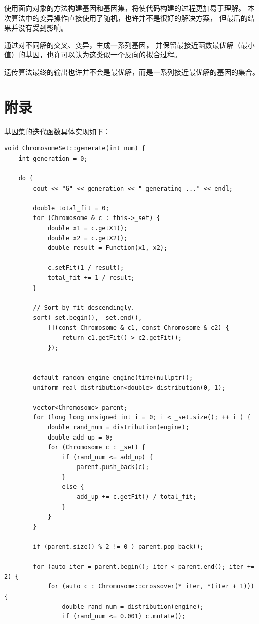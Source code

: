 \documentclass[UTF8]{ctexart}
\begin{document}
使用面向对象的方法构建基因和基因集，将使代码构建的过程更加易于理解。
本次算法中的变异操作直接使用了随机，也许并不是很好的解决方案，
但最后的结果并没有受到影响。

通过对不同解的交叉、变异，生成一系列基因，
并保留最接近函数最优解（最小值）的基因，也许可以认为这类似一个反向的拟合过程。

遗传算法最终的输出也许并不会是最优解，而是一系列接近最优解的基因的集合。


\section{附录}

基因集的迭代函数具体实现如下：

\begin{lstlisting}
void ChromosomeSet::generate(int num) {
    int generation = 0;

    do {
        cout << "G" << generation << " generating ..." << endl;

        double total_fit = 0;
        for (Chromosome & c : this->_set) {
            double x1 = c.getX1();
            double x2 = c.getX2();
            double result = Function(x1, x2);

            c.setFit(1 / result);
            total_fit += 1 / result;
        }

        // Sort by fit descendingly.
        sort(_set.begin(), _set.end(),
            [](const Chromosome & c1, const Chromosome & c2) {
                return c1.getFit() > c2.getFit();
            });


        default_random_engine engine(time(nullptr));
        uniform_real_distribution<double> distribution(0, 1);

        vector<Chromosome> parent;
        for (long long unsigned int i = 0; i < _set.size(); ++ i ) {
            double rand_num = distribution(engine);
            double add_up = 0;
            for (Chromosome c : _set) {
                if (rand_num <= add_up) {
                    parent.push_back(c);
                }
                else {
                    add_up += c.getFit() / total_fit;
                }
            }
        }

        if (parent.size() % 2 != 0 ) parent.pop_back();

        for (auto iter = parent.begin(); iter < parent.end(); iter += 2) {
            for (auto c : Chromosome::crossover(* iter, *(iter + 1))) {
                double rand_num = distribution(engine);
                if (rand_num <= 0.001) c.mutate();


\end{lstlisting}
\end{document}
